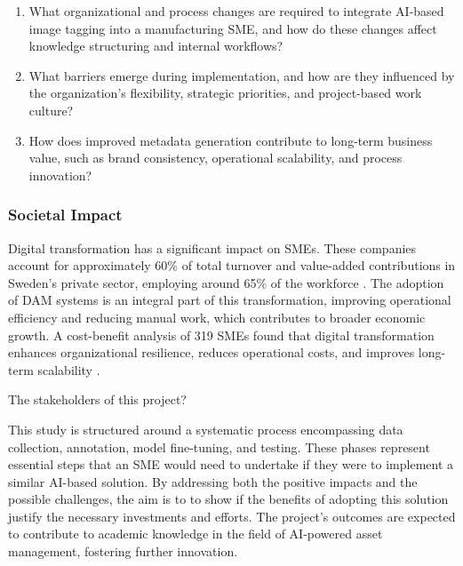 \documentclass[a4paper,10pt,twocolumn]{article}
\numberwithin{figure}{section}
\numberwithin{table}{section}
\begin{document}
\begin{enumerate}[label=(\alph*), resume]
    \item What organizational and process changes are 
    required to integrate AI-based image tagging into a manufacturing 
    SME, and how do these changes affect knowledge structuring and 
    internal workflows?
    
    \item What barriers emerge during implementation, and how are they
    influenced by the organization’s flexibility, strategic priorities, 
    and project-based work culture?

    \item How does improved metadata generation contribute to long-term 
    business value, such as brand consistency, operational scalability, and process innovation?
    
\end{enumerate}   

\subsubsection{Societal Impact}
\vspace{0.2cm}
Digital transformation has a significant impact on SMEs.
These companies account for approximately 60\% of total turnover and value-added 
contributions in Sweden’s private sector, employing around 65\% of the 
workforce \citep{tillvaxtverket2021}.
The adoption of DAM systems is an integral part of this transformation, 
improving operational efficiency and reducing manual work,
which contributes to broader economic growth. A cost-benefit analysis of 319 SMEs 
found that digital transformation enhances organizational resilience, reduces 
operational costs, and improves long-term scalability \citep{teng2022}.

\vspace{0.3cm}
The stakeholders of this project?

This study is structured around a systematic process 
encompassing data collection, annotation, model fine-tuning, and testing. 
These phases represent essential steps that an SME would need to undertake 
if they were to implement a similar AI-based solution. 
By addressing both the positive impacts and the possible challenges, the aim is to
to show if the benefits of adopting this solution
justify the necessary investments and efforts.
The project’s outcomes are expected to contribute to 
academic knowledge in the field of AI-powered asset management, 
fostering further innovation. 
\end{document}
